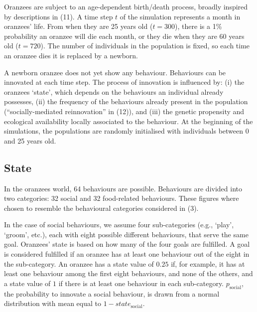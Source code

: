 \documentclass[9pt,twocolumn,twoside,]{pnas-new}
\begin{document}
Oranzees are subject to an age-dependent birth/death process, broadly
inspired by descriptions in (11). A time step \(t\) of the simulation
represents a month in oranzees' life. From when they are 25 years old
(\(t=300\)), there is a 1\% probability an oranzee will die each month,
or they die when they are 60 years old (\(t=720\)). The number of
individuals in the population is fixed, so each time an oranzee dies it
is replaced by a newborn.

A newborn oranzee does not yet show any behaviour. Behaviours can be
innovated at each time step. The process of innovation is influenced by:
(i) the oranzees `state', which depends on the behaviours an individual
already possesses, (ii) the frequency of the behaviours already present
in the population (``socially-mediated reinnovation'' in (12)), and
(iii) the genetic propensity and ecological availability locally
associated to the behaviour. At the beginning of the simulations, the
populations are randomly initialised with individuals between 0 and 25
years old.

\subsection*{State}\label{format}

In the oranzees world, 64 behaviours are possible. Behaviours are
divided into two categories: 32 social and 32 food-related behaviours.
These figures where chosen to resemble the behavioural categories
considered in (3).

In the case of social behaviours, we assume four sub-categories (e.g.,
`play', `groom', etc.), each with eight possible different behaviours,
that serve the same goal. Oranzees' state is based on how many of the
four goals are fulfilled. A goal is considered fulfilled if an oranzee
has at least one behaviour out of the eight in the sub-category. An
oranzee has a state value of \(0.25\) if, for example, it has at least
one behaviour among the first eight behaviours, and none of the others,
and a state value of \(1\) if there is at least one behaviour in each
sub-category. \(p_\text{social}\), the probability to innovate a social
behaviour, is drawn from a normal distribution with mean equal to
\(1-state_\text{social}\).
\end{document}
